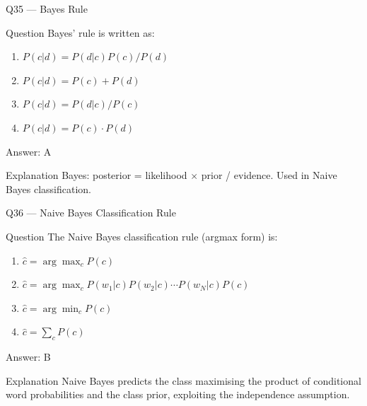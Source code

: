 \documentclass[aspectratio=169,8pt]{beamer}
\begin{document}
	\begin{frame}{Q35 --- Bayes Rule}
		\begin{block}{Question}
			Bayes' rule is written as:
			\begin{enumerate}
				\item $P(c|d) = P(d|c) P(c) / P(d)$
				\item $P(c|d) = P(c) + P(d)$
				\item $P(c|d) = P(d|c) / P(c)$
				\item $P(c|d) = P(c) \cdot P(d)$
			\end{enumerate}
		\end{block}
		\begin{exampleblock}{Answer: A}\end{exampleblock}
		\begin{block}{Explanation}
			Bayes: posterior = likelihood $\times$ prior / evidence. Used in Naive Bayes classification.
		\end{block}
	\end{frame}
	
	\begin{frame}{Q36 --- Naive Bayes Classification Rule}
		\begin{block}{Question}
			The Naive Bayes classification rule (argmax form) is:
			\begin{enumerate}
				\item $\hat{c} = \arg\max_c P(c)$
				\item $\hat{c} = \arg\max_c P(w_1|c) P(w_2|c) \cdots P(w_N|c) P(c)$
				\item $\hat{c} = \arg\min_c P(c)$
				\item $\hat{c} = \sum_c P(c)$
			\end{enumerate}
		\end{block}
		\begin{exampleblock}{Answer: B}\end{exampleblock}
		\begin{block}{Explanation}
			Naive Bayes predicts the class maximising the product of conditional word probabilities and the class prior, exploiting the independence assumption.
		\end{block}
	\end{frame}
	
\end{document}
